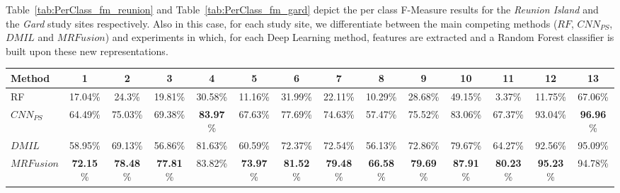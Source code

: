 \documentclass[journal]{IEEEtran}
\newcommand{\method}{$MRFusion$}
\begin{document}
Table~\ref{tab:PerClass_fm_reunion} and Table~\ref{tab:PerClass_fm_gard} depict the per class F-Measure results for the \textit{Reunion Island} and the \textit{Gard} study sites respectively. Also in this case, for each study site, we differentiate between the main competing methods ($RF$, $CNN_{PS}$, $DMIL$ and \method) and experiments in which, for each Deep Learning method, features are extracted and a Random Forest classifier is built upon these new representations.

\begin{table*}[!ht]
\scriptsize
\centering
\begin{tabular}{|l||c|c|c|c|c|c|c|c|c|c|c|c|c|}
	\hline
\textbf{Method} & 1 & 2 & 3 & 4 & 5 & 6 & 7 & 8 & 9 & 10 & 11 & 12 & 13\\  \hline \hline
RF & 17.04\% & 24.3\% & 19.81\% & 30.58\% & 11.16\% & 31.99\% & 22.11\% & 10.29\% & 28.68\% & 49.15\% & 3.37\% & 11.75\% & 67.06\% \\ \hline
$CNN_{PS}$ & 64.49\% & 75.03\% & 69.38\% & \textbf{83.97}\% & 67.63\% & 77.69\% & 74.63\% & 57.47\% & 75.52\% & 83.06\% & 67.37\% & 93.04\% & \textbf{96.96}\% \\ \hline
$DMIL$ & 58.95\% & 69.13\% & 56.86\% & 81.63\% & 60.59\% & 72.37\% & 72.54\% & 56.13\% & 72.86\% & 79.67\% & 64.27\% & 92.56\% & 95.09\% \\ \hline
\method & \textbf{72.15}\% & \textbf{78.48}\% & \textbf{77.81}\% & 83.82\% & \textbf{73.97}\% & \textbf{81.52}\% & \textbf{79.48}\% & \textbf{66.58}\% & \textbf{79.69}\% & \textbf{87.91}\% & \textbf{80.23}\% & \textbf{95.23}\% & 94.78\% \\ \hline \hline



\end{tabular}
\end{table*}
\end{document}
